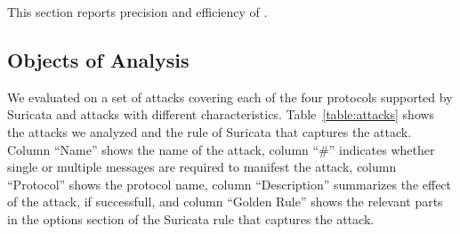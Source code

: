 \documentclass[runningheads]{llncs}
\begin{document}


This section reports precision and efficiency of \tname.


\subsection{Objects of Analysis}

We evaluated \tname{} on a set of attacks covering each of the four
protocols supported by Suricata and attacks with different
characteristics. Table~\ref{table:attacks} shows the attacks we
analyzed and the rule of Suricata that captures the attack. Column
``Name'' shows the name of the attack, column ``\#'' indicates whether
single or multiple messages are required to manifest the attack,
column ``Protocol'' shows the protocol name, column ``Description''
summarizes the effect of the attack, if successfull, and column
``Golden Rule'' shows the relevant parts in the options section of the
Suricata rule that captures the attack.
\end{document}
